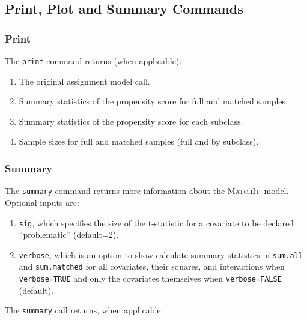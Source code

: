 \documentclass[oneside,letterpaper,titlepage]{article}
\newcommand{\MatchIt}{\textsc{MatchIt}}
\begin{document}
\subsection{Print, Plot and Summary Commands}
\subsubsection{Print}
The \texttt{print} command returns (when applicable):
\begin{enumerate}
\item The original assignment model call.
\item Summary statistics of the propensity score for full and matched
  samples.
\item Summary statistics of the propensity score for each subclass.
\item Sample sizes for full and matched samples (full and by subclass).
\end{enumerate}

\subsubsection{Summary}
\label{cmd:sum}
The \texttt{summary} command returns more information about the
\MatchIt\ model.  Optional inputs are:

\begin{enumerate}
\item \texttt{sig}, which specifies the size of the t-statistic for a
  covariate to be declared ``problematic'' (default=2).
  
\item \texttt{verbose}, which is an option to show calculate summary
  statistics in \texttt{sum.all} and \texttt{sum.matched} for all
  covariates, their squares, and interactions when
  \texttt{verbose=TRUE} and only the covariates themselves when
  \texttt{verbose=FALSE} (default).
\end{enumerate}

The \texttt{summary} call returns, when applicable:
\end{document}
